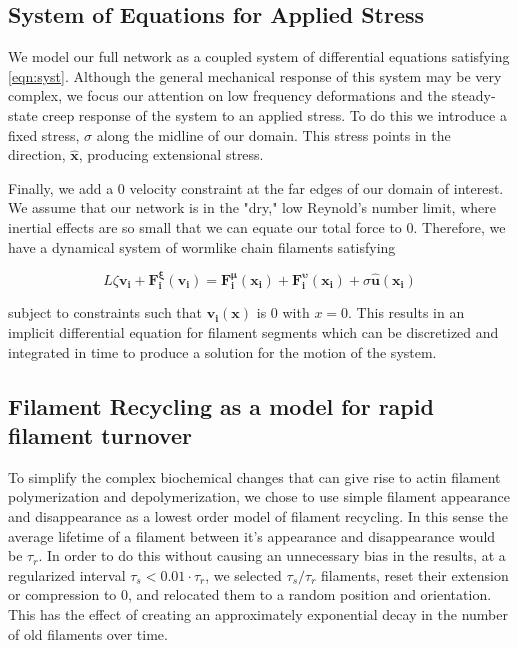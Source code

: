 \documentclass[10pt,letterpaper]{article}
\begin{document}
\subsection*{System of Equations for Applied Stress}
We model our full network as a coupled system of differential equations satisfying \ref{eqn:syst}.  Although the general mechanical response of this system may be very complex, we focus our attention on low frequency deformations and the steady-state creep response of the system to an applied stress.  To do this we introduce a fixed stress, $\sigma$ along the midline of our domain.  This stress points in the direction, $\mathbf{\hat{x}}$, producing extensional stress.

Finally, we add a 0 velocity constraint at the far edges of our domain of interest.  We assume that our network is in the "dry," low Reynold's number limit, where inertial effects are so small that we can equate our total force to 0.  Therefore, we have a dynamical system of wormlike chain filaments satisfying

\begin{equation}
L\zeta\mathbf{ v_i} +\mathbf{F^{\xi}_i(v_i)}= \mathbf{F^{\mu}_i(x_i)}+\mathbf{F^{\upsilon}_i(x_i)} + \sigma\mathbf{\hat{u}(x_i)}
\end{equation}

subject to constraints such that $\mathbf{v_i(x)}$ is 0 with $x=0$.  This results in an implicit differential equation for filament segments which can be discretized and integrated in time to produce a solution for the motion of the system.


\subsection*{Filament Recycling as a model for rapid filament turnover}

To simplify the complex biochemical changes that can give rise to actin filament polymerization and depolymerization, we chose to use simple filament appearance and disappearance as a lowest order model of filament recycling.  In this sense the average lifetime of a filament between it's appearance and disappearance would be $\tau_r$.  In order to do this without causing an unnecessary bias in the results, at a regularized interval $\tau_s < 0.01\cdot\tau_r$, we selected $\tau_s/\tau_r$ filaments, reset their extension or compression to 0, and relocated them to a random position and orientation.  This has the effect of creating an approximately exponential decay in the number of old filaments over time.
\end{document}
